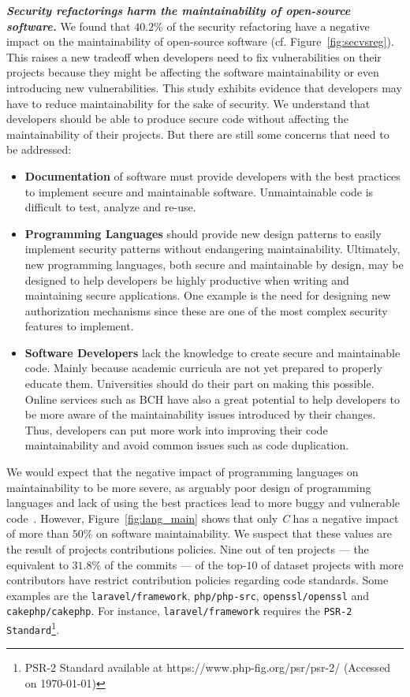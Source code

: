 \documentclass[10pt,conference]{IEEEtran}
\begin{document}
\textbf{\textit{Security refactorings harm the maintainability of open-source software.}}
%
We found that $40.2\%$ of the security refactoring have a negative impact on the
maintainability of open-source software (cf. Figure~\ref{fig:secvsreg}). This raises
a new tradeoff when developers need to fix vulnerabilities on their projects
because they might be affecting the software maintainability or even introducing
new vulnerabilities. This study exhibits evidence that developers may have to
reduce maintainability for the sake of security. We understand that developers
should be able to produce secure code without affecting the maintainability of
their projects. But there are still some concerns that need to be addressed:
\begin{itemize}
	\item \textbf{Documentation} of software must provide developers with the
	best practices to implement secure and maintainable software. Unmaintainable
	code is difficult to test, analyze and re-use.

	\item\textbf{Programming Languages} should provide new design patterns to
	easily implement security patterns without endangering maintainability.
	Ultimately, new programming languages, both secure and maintainable by design,
	may be designed to help developers be highly productive when writing and
	maintaining  secure applications. One example is the need for designing new
	authorization mechanisms since these are one of the most complex security
	features to implement.

	\item \textbf{Software Developers} lack the knowledge to create secure and
	maintainable code. Mainly because academic curricula are not yet prepared
	to properly educate them. Universities should do their part on making
	this possible. Online services such as BCH have also a great potential to help
	developers to be more aware of the maintainability issues introduced by their
	changes. Thus, developers can put more work into improving their code maintainability
	and avoid common issues such as code duplication.

\end{itemize}


We would expect that the negative impact of programming languages on
maintainability to be more severe, as arguably poor design of programming
languages and lack of using the best practices lead to more buggy and vulnerable
code~\cite{Ray:2017:LSP:3144574.3126905, 2019arXiv190110220B}. However,
Figure~\ref{fig:lang_main} shows that only \emph{C} has a negative impact of
more than $50\%$ on software maintainability. We suspect that these values are
the result of projects contributions policies. Nine out of ten projects --- the
equivalent to $31.8\%$ of the commits --- of the top-$10$ of dataset projects
with more contributors have restrict contribution policies regarding code
standards. Some examples are the \texttt{laravel/framework},
\texttt{php/php-src}, \texttt{openssl/openssl} and \texttt{cakephp/cakephp}. For
instance, \texttt{laravel/framework} requires the \texttt{PSR-2
Standard}\footnote{PSR-2 Standard available at
https://www.php-fig.org/psr/psr-2/ (Accessed on \today{})}.
\end{document}
